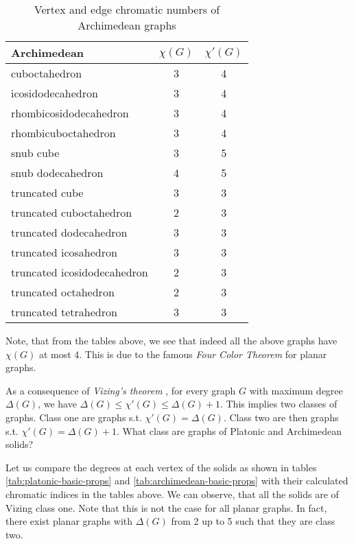 \begin{table}[H]
    \centering
    \caption{Vertex and edge chromatic numbers of Archimedean graphs}
    \vspace{5pt}
    \label{tab:archimedean-chrom-nums}
    \begin{tabular}{|l|c|c|}
    \hline
    Archimedean & $\chi(G)$ & $\chi'(G)$ \\
    \hline\hline
    cuboctahedron & 3 & 4 \\
    \hline
    icosidodecahedron & 3 & 4 \\
    \hline
    rhombicosidodecahedron & 3 & 4 \\
    \hline
    rhombicuboctahedron & 3 & 4 \\
    \hline
    snub cube & 3 & 5 \\
    \hline
    snub dodecahedron & 4 & 5 \\
    \hline
    truncated cube & 3 & 3 \\
    \hline
    truncated cuboctahedron & 2 & 3 \\
    \hline
    truncated dodecahedron & 3 & 3 \\
    \hline
    truncated icosahedron & 3 & 3 \\
    \hline
    truncated icosidodecahedron & 2 & 3 \\
    \hline
    truncated octahedron & 2 & 3 \\
    \hline
    truncated tetrahedron & 3 & 3 \\
    \hline
    \end{tabular}
\end{table}

Note, that from the tables above, we see that indeed all the above graphs have $\chi(G)$ at most 4. This is due to the famous \textit{Four Color Theorem} \cite{appelhaken76} for planar graphs.

As a consequence of \textit{Vizing's theorem} \cite{misra92}, for every graph $G$ with maximum degree $\Delta(G)$, we have $\Delta(G) \leq \chi'(G) \leq \Delta(G) + 1$. This implies two classes of graphs. Class one are graphs s.t. $\chi'(G) = \Delta(G)$. Class two are then graphs s.t. $\chi'(G) = \Delta(G) + 1$. What class are graphs of Platonic and Archimedean solids?

Let us compare the degrees at each vertex of the solids as shown in tables \ref{tab:platonic-basic-props} and \ref{tab:archimedean-basic-props} with their calculated chromatic indices in the tables above. We can observe, that all the solids are of Vizing class one. Note that this is not the case for all planar graphs. In fact, there exist planar graphs with $\Delta(G)$ from 2 up to 5 such that they are class two.

